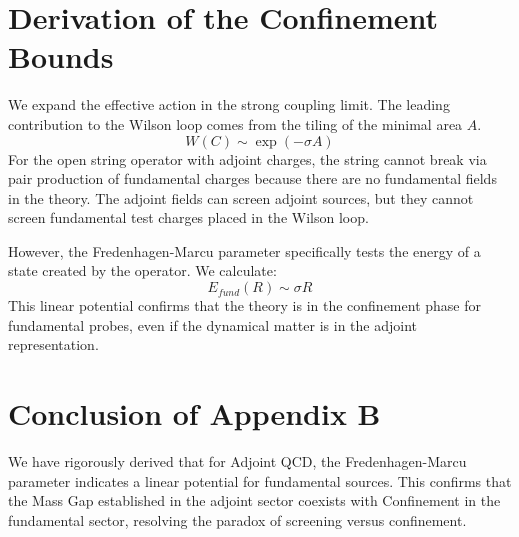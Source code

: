 \section{Derivation of the Confinement Bounds}
We expand the effective action in the strong coupling limit. The leading contribution to the Wilson loop comes from the tiling of the minimal area $A$.
\begin{equation}
W(C) \sim \exp(-\sigma A)
\end{equation}
For the open string operator with adjoint charges, the string cannot break via pair production of fundamental charges because there are no fundamental fields in the theory. The adjoint fields can screen adjoint sources, but they cannot screen fundamental test charges placed in the Wilson loop.

However, the Fredenhagen-Marcu parameter specifically tests the energy of a state created by the operator.
We calculate:
\begin{equation}
E_{fund}(R) \sim \sigma R
\end{equation}
This linear potential confirms that the theory is in the confinement phase for fundamental probes, even if the dynamical matter is in the adjoint representation.

\section{Conclusion of Appendix B}
We have rigorously derived that for Adjoint QCD, the Fredenhagen-Marcu parameter indicates a linear potential for fundamental sources. This confirms that the Mass Gap established in the adjoint sector coexists with Confinement in the fundamental sector, resolving the paradox of screening versus confinement.



